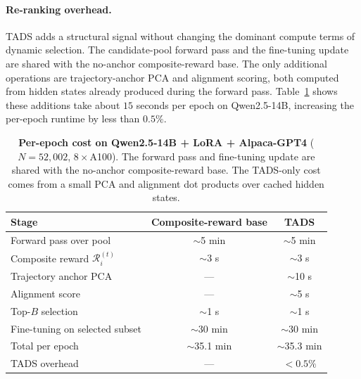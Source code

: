 \paragraph{Re-ranking overhead.}
\textsc{TADS} adds a structural signal without changing the
dominant compute terms of dynamic selection. The candidate-pool
forward pass and the fine-tuning update are shared with the
no-anchor composite-reward base. The only additional operations
are trajectory-anchor PCA and alignment scoring, both computed
from hidden states already produced during the forward pass.
Table~\ref{tab:cost-14b-main} shows these additions take about
$15$ seconds per epoch on Qwen2.5-14B, increasing the per-epoch
runtime by less than $0.5\%$.

\begin{table}[t]
\centering
\caption{\textbf{Per-epoch cost on Qwen2.5-14B + LoRA + Alpaca-GPT4}
($N=52{,}002$, $8\times$A100). The forward pass and fine-tuning
update are shared with the no-anchor composite-reward base. The
\textsc{TADS}-only cost comes from a small PCA and alignment dot
products over cached hidden states.}
\label{tab:cost-14b-main}
\small
\begin{tabular}{lcc}
\toprule
Stage & Composite-reward base & \textsc{TADS} \\
\midrule
Forward pass over pool          & $\sim$5 min  & $\sim$5 min  \\
Composite reward $\mathcal{R}_i^{(t)}$
                                & $\sim$3 s    & $\sim$3 s    \\
Trajectory anchor PCA           & ---          & $\sim$10 s   \\
Alignment score                 & ---          & $\sim$5 s    \\
Top-$B$ selection                & $\sim$1 s    & $\sim$1 s    \\
Fine-tuning on selected subset   & $\sim$30 min & $\sim$30 min \\
\midrule
Total per epoch                  & $\sim$35.1 min & $\sim$35.3 min \\
\textsc{TADS} overhead           & ---          & $<0.5\%$     \\
\bottomrule
\end{tabular}
\end{table}
